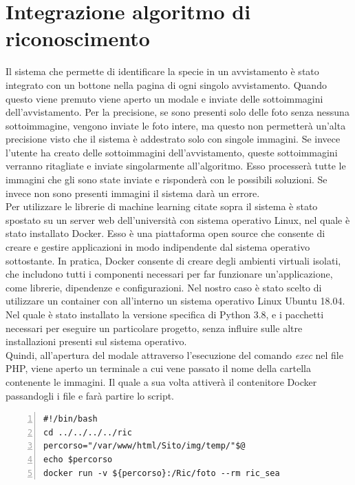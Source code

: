 \documentclass[a4paper,final,12pt]{report}
\begin{document}
\section{Integrazione algoritmo di riconoscimento}
Il sistema che permette di identificare la specie in un avvistamento è stato integrato con un bottone nella pagina di ogni singolo avvistamento. Quando questo viene premuto viene aperto un modale e inviate delle sottoimmagini dell'avvistamento. Per la precisione, se sono presenti solo delle foto senza nessuna sottoimmagine, vengono inviate le foto intere, ma questo non permetterà un'alta precisione visto che il sistema è addestrato solo con singole immagini. Se invece l'utente ha creato delle sottoimmagini dell'avvistamento, queste sottoimmagini verranno ritagliate e inviate singolarmente all'algoritmo. Esso processerà tutte le immagini che gli sono state inviate e risponderà con le possibili soluzioni. Se invece non sono presenti immagini il sistema darà un errore.\\
Per utilizzare le librerie di machine learning citate sopra il sistema è stato spostato su un server web dell'università con sistema operativo Linux, nel quale è stato installato Docker. Esso è una piattaforma open source che consente di creare e gestire applicazioni in modo indipendente dal sistema operativo sottostante. In pratica, Docker consente di creare degli ambienti virtuali isolati, che includono tutti i componenti necessari per far funzionare un'applicazione, come librerie, dipendenze e configurazioni. Nel nostro caso è stato scelto di utilizzare un container con all'interno un sistema operativo Linux Ubuntu 18.04. Nel quale è stato installato la versione specifica di Python 3.8, e i pacchetti necessari per eseguire un particolare progetto, senza influire sulle altre installazioni presenti sul sistema operativo.\\
Quindi, all'apertura del modale attraverso l'esecuzione del comando \textit{exec} nel file PHP, viene aperto un terminale a cui vene passato il nome della cartella contenente le immagini. Il quale a sua volta attiverà il contenitore Docker passandogli i file e farà partire lo script.
\begin{lstlisting}[caption={Codice script bash.}, label={lst:script_bash}, breaklines, escapechar=`\%, frame=lines, basicstyle=\small\ttfamily, keepspaces=true, numbers=left]
#!/bin/bash
cd ../../../../ric
percorso="/var/www/html/Sito/img/temp/"$@
echo $percorso
docker run -v ${percorso}:/Ric/foto --rm ric_sea
\end{lstlisting}
\end{document}
